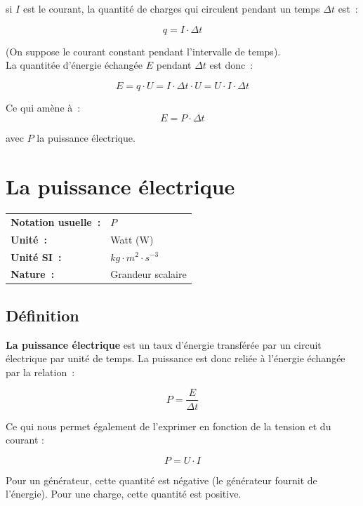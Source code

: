 si $I$ est le courant, la quantité de charges qui circulent pendant un temps $\Delta t$ est~: 

$$q = I \cdot \Delta t$$

(On suppose le courant constant pendant l'intervalle de temps).\\

La quantitée d'énergie échangée $E$ pendant $\Delta t$ est donc~:

$$ E = q \cdot U = I \cdot \Delta t \cdot U = U \cdot I \cdot \Delta t $$

Ce qui amène à~: \\
\begin{equation}
E = P \cdot \Delta t 
\end{equation}

avec $P$ la puissance électrique.

\section{La puissance électrique}

\begin{tabular}{ll}
\textbf{Notation usuelle~:} & $P$ \\
\textbf{Unité~:} & Watt (W) \\
	\textbf{Unité SI~:} & $kg \cdot m^2 \cdot s^{-3}$ \\
\textbf{Nature~:} & Grandeur scalaire \\
\end{tabular} 

\subsection*{Définition}

\textbf{La puissance électrique} est un taux d'énergie transférée par un circuit électrique par unité de temps. La puissance est donc reliée à l'énergie échangée par la relation~:

\begin{equation}
	P = \dfrac{E}{\Delta t}
\end{equation}

Ce qui nous permet également de l'exprimer en fonction de la tension et du courant :

\begin{equation}
	P = U \cdot I
\end{equation}

Pour un générateur, cette quantité est négative (le générateur fournit de l'énergie). Pour une charge, cette quantité est positive.

